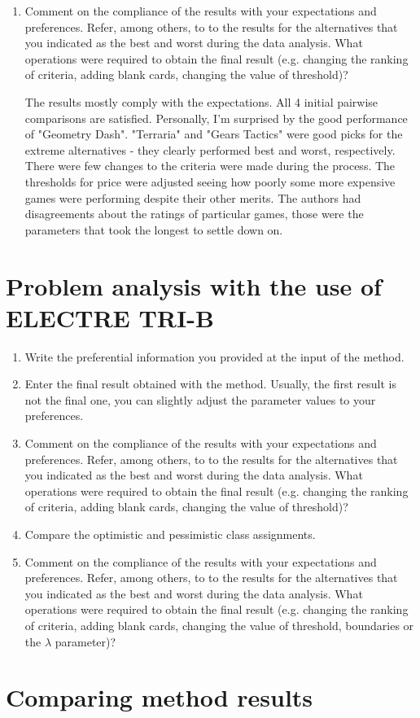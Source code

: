 \documentclass{article}
\begin{document}
\begin{enumerate}
    \item Comment on the compliance of the results with your expectations and preferences. Refer, among
    others, to to the results for the alternatives that you indicated as the best and worst during the data
    analysis. What operations were required to obtain the final result (e.g. changing the ranking of criteria,
    adding blank cards, changing the value of threshold)?

    The results mostly comply with the expectations.
    All 4 initial pairwise comparisons are satisfied. Personally, I'm surprised by the good performance of "Geometry Dash".
    "Terraria" and "Gears Tactics" were good picks for the extreme alternatives - they clearly performed best and worst, respectively.
    There were few changes to the criteria were made during the process. The thresholds for price were adjusted seeing how poorly some more expensive games were performing despite their other merits. The authors had disagreements about the ratings of particular games, those were the parameters that took the longest to settle down on.

    \end{enumerate}


\clearpage
\section{Problem analysis with the use of ELECTRE TRI-B}

\begin{enumerate}

    \item Write the preferential information you provided at the input of the method.

    \item Enter the final result obtained with the method. Usually, the first result is not the final one, you can
    slightly adjust the parameter values to your preferences.

    \item Comment on the compliance of the results with your expectations and preferences. Refer, among
    others, to to the results for the alternatives that you indicated as the best and worst during the data
    analysis. What operations were required to obtain the final result (e.g. changing the ranking of criteria,
    adding blank cards, changing the value of threshold)?

    \item Compare the optimistic and pessimistic class assignments.

    \item Comment on the compliance of the results with your expectations and preferences. Refer, among
    others, to to the results for the alternatives that you indicated as the best and worst during the data
    analysis. What operations were required to obtain the final result (e.g. changing the ranking of criteria,
    adding blank cards, changing the value of threshold, boundaries or the $\lambda$ parameter)?

\end{enumerate}

\clearpage
\section{Comparing method results}
\end{document}
